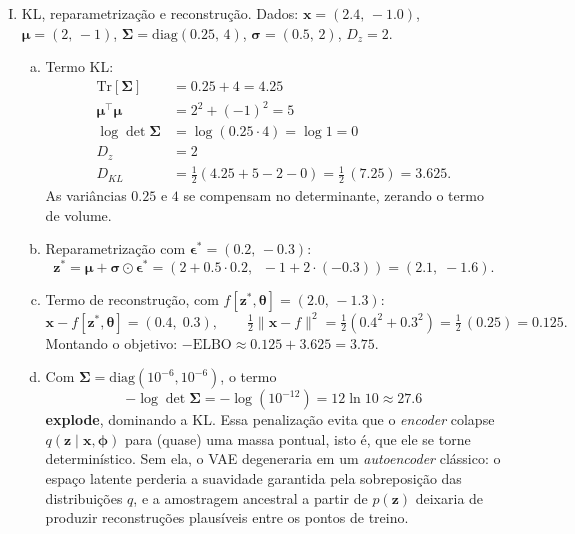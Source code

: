 \documentclass{dlproblemset}
\newcommand{\thetav}{\boldsymbol{\theta}}
\begin{document}
\begin{enumerate}[I)]
    \item KL, reparametrização e reconstrução. Dados: $\mathbf{x} = (2.4,\, -1.0)$, $\boldsymbol{\mu} = (2,\, -1)$, $\boldsymbol{\Sigma} = \mathrm{diag}(0.25,\, 4)$, $\boldsymbol{\sigma} = (0.5,\, 2)$, $D_z = 2$.
    \begin{enumerate}[(a)]
        \item Termo KL:
        \begin{align*}
            \mathrm{Tr}[\boldsymbol{\Sigma}] &= 0.25 + 4 = 4.25 \\
            \boldsymbol{\mu}^{\top}\boldsymbol{\mu} &= 2^{2} + (-1)^{2} = 5 \\
            \log\det\boldsymbol{\Sigma} &= \log(0.25 \cdot 4) = \log 1 = 0 \\
            D_z &= 2 \\
            D_{KL} &= \tfrac{1}{2}\left(4.25 + 5 - 2 - 0\right) = \tfrac{1}{2}\,(7.25) = 3.625.
        \end{align*}
        As variâncias $0.25$ e $4$ se compensam no determinante, zerando o termo de volume.
        \item Reparametrização com $\boldsymbol{\epsilon}^{*} = (0.2,\, -0.3)$:
        \[
            \mathbf{z}^{*} = \boldsymbol{\mu} + \boldsymbol{\sigma} \odot \boldsymbol{\epsilon}^{*}
            = \left(2 + 0.5 \cdot 0.2,\;\; -1 + 2 \cdot (-0.3)\right)
            = (2.1,\; -1.6).
        \]
        \item Termo de reconstrução, com $f[\mathbf{z}^{*},\thetav] = (2.0,\, -1.3)$:
        \[
            \mathbf{x} - f[\mathbf{z}^{*},\thetav] = (0.4,\; 0.3), \qquad
            \tfrac{1}{2}\lVert \mathbf{x} - f \rVert^{2} = \tfrac{1}{2}\left(0.4^{2} + 0.3^{2}\right) = \tfrac{1}{2}\,(0.25) = 0.125.
        \]
        Montando o objetivo: $-\mathrm{ELBO} \approx 0.125 + 3.625 = 3.75$.
        \item Com $\boldsymbol{\Sigma} = \mathrm{diag}(10^{-6}, 10^{-6})$, o termo
        \[
            -\log\det\boldsymbol{\Sigma} = -\log\!\left(10^{-12}\right) = 12\ln 10 \approx 27.6
        \]
        \textbf{explode}, dominando a KL. Essa penalização evita que o \textit{encoder} colapse $q(\mathbf{z} \mid \mathbf{x}, \boldsymbol{\phi})$ para (quase) uma massa pontual, isto é, que ele se torne determinístico. Sem ela, o VAE degeneraria em um \textit{autoencoder} clássico: o espaço latente perderia a suavidade garantida pela sobreposição das distribuições $q$, e a amostragem ancestral a partir de $p(\mathbf{z})$ deixaria de produzir reconstruções plausíveis entre os pontos de treino.
    \end{enumerate}

\end{enumerate}
\color{black}
\end{document}

